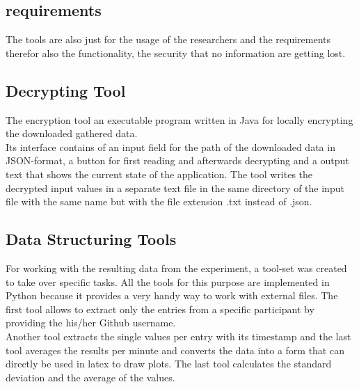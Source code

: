 \subsection{requirements}
The tools are also just for the usage of the researchers and the requirements therefor also the functionality, the security that no information are getting lost.

\subsection{Decrypting Tool}
The encryption tool an executable program written in Java for locally encrypting the downloaded gathered data.\\
Its interface contains of an input field for the path of the downloaded data in JSON-format, a button for first reading and afterwards decrypting and a output text that shows the current state of the application. The tool writes the decrypted input values in a separate text file in the same directory of the input file with the same name but with the file extension .txt instead of .json. 

\subsection{Data Structuring Tools}
For working with the resulting data from the experiment, a tool-set was created to take over specific tasks. All the tools for this purpose are implemented in Python because it provides a very handy way to work with external files. 
The first tool allows to extract only the entries from a specific participant by providing the his/her Github username.\\
Another tool extracts the single values per entry with its timestamp and the last tool averages the results per minute and converts the data into a form that can directly be used in latex to draw plots.
The last tool calculates the standard deviation and the average of the values. 


